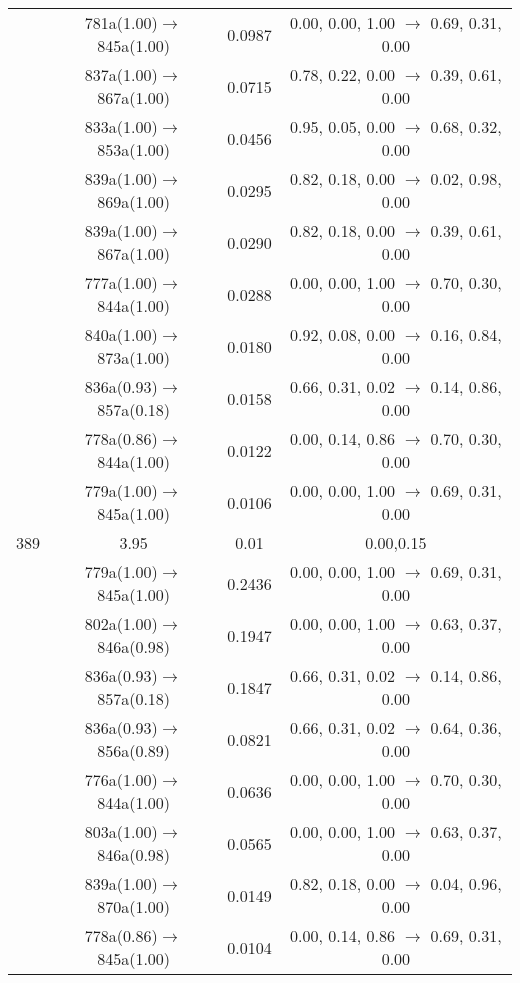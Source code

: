\documentclass[10pt,a4paper]{article}
\begin{document}
\begin{longtable}{c|c|c|c}
 	& 781a(1.00)$\rightarrow$845a(1.00) &	 0.0987 &	 0.00, 0.00, 1.00 $\rightarrow$ 0.69, 0.31, 0.00 \\ 
 	& 837a(1.00)$\rightarrow$867a(1.00) &	 0.0715 &	 0.78, 0.22, 0.00 $\rightarrow$ 0.39, 0.61, 0.00 \\ 
 	& 833a(1.00)$\rightarrow$853a(1.00) &	 0.0456 &	 0.95, 0.05, 0.00 $\rightarrow$ 0.68, 0.32, 0.00 \\ 
 	& 839a(1.00)$\rightarrow$869a(1.00) &	 0.0295 &	 0.82, 0.18, 0.00 $\rightarrow$ 0.02, 0.98, 0.00 \\ 
 	& 839a(1.00)$\rightarrow$867a(1.00) &	 0.0290 &	 0.82, 0.18, 0.00 $\rightarrow$ 0.39, 0.61, 0.00 \\ 
 	& 777a(1.00)$\rightarrow$844a(1.00) &	 0.0288 &	 0.00, 0.00, 1.00 $\rightarrow$ 0.70, 0.30, 0.00 \\ 
 	& 840a(1.00)$\rightarrow$873a(1.00) &	 0.0180 &	 0.92, 0.08, 0.00 $\rightarrow$ 0.16, 0.84, 0.00 \\ 
 	& 836a(0.93)$\rightarrow$857a(0.18) &	 0.0158 &	 0.66, 0.31, 0.02 $\rightarrow$ 0.14, 0.86, 0.00 \\ 
 	& 778a(0.86)$\rightarrow$844a(1.00) &	 0.0122 &	 0.00, 0.14, 0.86 $\rightarrow$ 0.70, 0.30, 0.00 \\ 
 	& 779a(1.00)$\rightarrow$845a(1.00) &	 0.0106 &	 0.00, 0.00, 1.00 $\rightarrow$ 0.69, 0.31, 0.00 \\ 
 \hline389 &	 3.95 &	 0.01 &	 0.00,0.15 \\ 
  	& 779a(1.00)$\rightarrow$845a(1.00) &	 0.2436 &	 0.00, 0.00, 1.00 $\rightarrow$ 0.69, 0.31, 0.00 \\ 
 	& 802a(1.00)$\rightarrow$846a(0.98) &	 0.1947 &	 0.00, 0.00, 1.00 $\rightarrow$ 0.63, 0.37, 0.00 \\ 
 	& 836a(0.93)$\rightarrow$857a(0.18) &	 0.1847 &	 0.66, 0.31, 0.02 $\rightarrow$ 0.14, 0.86, 0.00 \\ 
 	& 836a(0.93)$\rightarrow$856a(0.89) &	 0.0821 &	 0.66, 0.31, 0.02 $\rightarrow$ 0.64, 0.36, 0.00 \\ 
 	& 776a(1.00)$\rightarrow$844a(1.00) &	 0.0636 &	 0.00, 0.00, 1.00 $\rightarrow$ 0.70, 0.30, 0.00 \\ 
 	& 803a(1.00)$\rightarrow$846a(0.98) &	 0.0565 &	 0.00, 0.00, 1.00 $\rightarrow$ 0.63, 0.37, 0.00 \\ 
 	& 839a(1.00)$\rightarrow$870a(1.00) &	 0.0149 &	 0.82, 0.18, 0.00 $\rightarrow$ 0.04, 0.96, 0.00 \\ 
 	& 778a(0.86)$\rightarrow$845a(1.00) &	 0.0104 &	 0.00, 0.14, 0.86 $\rightarrow$ 0.69, 0.31, 0.00 \\ 

\end{longtable}
\end{document}
